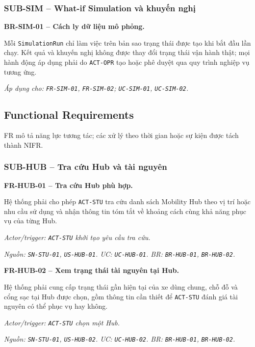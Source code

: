 \subsubsection{SUB-SIM -- What-if Simulation và khuyến nghị}

\noindent\textbf{BR-SIM-01 -- Cách ly dữ liệu mô phỏng.}\par
\nopagebreak[4]
Mỗi \texttt{SimulationRun} chỉ làm việc trên bản sao trạng thái được tạo khi bắt đầu lần chạy. Kết quả và khuyến nghị không được thay đổi trạng thái vận hành thật; mọi hành động áp dụng phải do \texttt{ACT-OPR} tạo hoặc phê duyệt qua quy trình nghiệp vụ tương ứng.

\textit{Áp dụng cho: \texttt{FR-SIM-01}, \texttt{FR-SIM-02}; \texttt{UC-SIM-01}, \texttt{UC-SIM-02}.}

\subsection{Functional Requirements}

FR mô tả năng lực tương tác; các xử lý theo thời gian hoặc sự kiện được tách thành NIFR.

\subsubsection{SUB-HUB -- Tra cứu Hub và tài nguyên}

\noindent\textbf{FR-HUB-01 -- Tra cứu Hub phù hợp.}\par
\nopagebreak[4]
Hệ thống phải cho phép \texttt{ACT-STU} tra cứu danh sách Mobility Hub theo vị trí hoặc nhu cầu sử dụng và nhận thông tin tóm tắt về khoảng cách cùng khả năng phục vụ của từng Hub.

\textit{Actor/trigger: \texttt{ACT-STU} khởi tạo yêu cầu tra cứu.}\par
\textit{Nguồn: \texttt{SN-STU-01}, \texttt{US-HUB-01}. UC: \texttt{UC-HUB-01}. BR: \texttt{BR-HUB-01}, \texttt{BR-HUB-02}.}

\medskip
\noindent\textbf{FR-HUB-02 -- Xem trạng thái tài nguyên tại Hub.}\par
\nopagebreak[4]
Hệ thống phải cung cấp trạng thái gần hiện tại của xe dùng chung, chỗ đỗ và cổng sạc tại Hub được chọn, gồm thông tin cần thiết để \texttt{ACT-STU} đánh giá tài nguyên có thể phục vụ hay không.

\textit{Actor/trigger: \texttt{ACT-STU} chọn một Hub.}\par
\textit{Nguồn: \texttt{SN-STU-01}, \texttt{US-HUB-02}. UC: \texttt{UC-HUB-02}. BR: \texttt{BR-HUB-01}, \texttt{BR-HUB-02}.}


